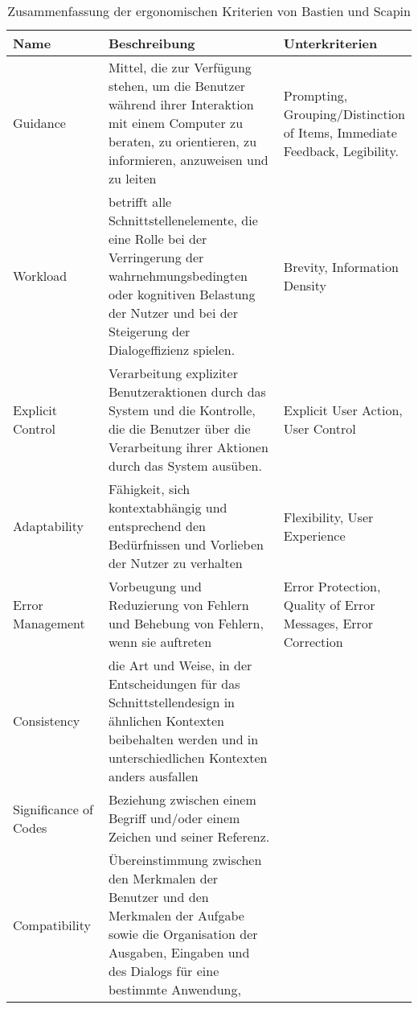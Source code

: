 \begin{table}[H]
  \begin{tabular}{p{0.25\linewidth} |p{0.5\linewidth}|p{0.25\linewidth}}
    Name                  & Beschreibung                                                                                                                                                                                 & Unterkriterien                                                            \\ \hline\hline

    Guidance              & Mittel, die zur Verfügung stehen, um die Benutzer während ihrer Interaktion mit einem Computer zu beraten, zu orientieren, zu informieren, anzuweisen und zu leiten                          & Prompting, Grouping/Distinction of Items, Immediate Feedback, Legibility. \\\hline
    Workload              & betrifft alle Schnittstellenelemente, die eine Rolle bei der Verringerung der wahrnehmungsbedingten oder kognitiven Belastung der Nutzer und bei der Steigerung der Dialogeffizienz spielen. & Brevity, Information Density                                              \\\hline
    Explicit Control      & Verarbeitung expliziter Benutzeraktionen durch das System und die Kontrolle, die die Benutzer über die Verarbeitung ihrer Aktionen durch das System ausüben.                                 & Explicit User Action,  User Control                                       \\\hline
    Adaptability          & Fähigkeit, sich kontextabhängig und entsprechend den Bedürfnissen und Vorlieben der Nutzer zu verhalten                                                                                      & Flexibility, User Experience                                              \\\hline
    Error Management      & Vorbeugung und Reduzierung von Fehlern und Behebung von Fehlern, wenn sie auftreten                                                                                                          & Error Protection, Quality of Error Messages, Error Correction             \\\hline
    Consistency           & die Art und Weise, in der Entscheidungen für das Schnittstellendesign in ähnlichen Kontexten beibehalten werden und in unterschiedlichen Kontexten anders ausfallen                          &                                                                           \\\hline
    Significance of Codes & Beziehung zwischen einem Begriff und/oder einem Zeichen und seiner Referenz.                                                                                                                 &                                                                           \\\hline
    Compatibility         & Übereinstimmung zwischen den Merkmalen der Benutzer und den Merkmalen der Aufgabe sowie die Organisation der Ausgaben, Eingaben und des Dialogs für eine bestimmte Anwendung,                &
  \end{tabular}
  \caption{Zusammenfassung der ergonomischen Kriterien von Bastien und Scapin}
\end{table}

